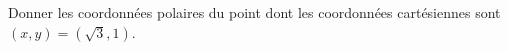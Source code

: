 
\begin{exercice}\label{exoOutilsMath-0012}

	Donner les coordonnées polaires du point dont les coordonnées cartésiennes sont $(x,y)=(\sqrt{3},1)$.

\end{exercice}
